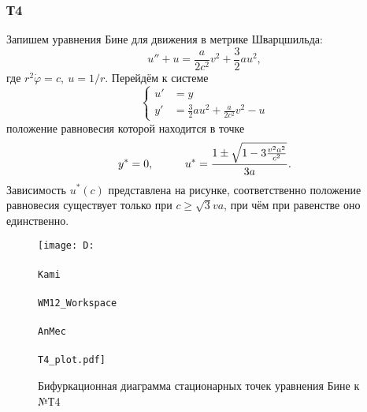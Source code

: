 \subsubsection*{Т4}

Запишем уравнения Бине для движения в метрике Шварцшильда:
\begin{equation*}
    u'' + u = \frac{a}{2c^2} v^2 + \frac{3}{2}a u^2,
\end{equation*}
где $r^2 \dot{\varphi} = c, \ u=1/r$. Перейдём к системе
\begin{equation*}
    \left\{\begin{aligned}
        u' &= y \\
        y' &= \frac{3}{2} a u^2 + \frac{a}{2c^2} v^2 - u
    \end{aligned}\right.
\end{equation*}
положение равновесия которой находится в точке
\begin{equation*}
    y^* = 0, \hspace{1 cm}
    u^* = 
    \frac{1\pm \sqrt{1-3 \frac{v^2 a^2}{c^2}}}{3a}.
\end{equation*}
Зависимость $u^*(c)$ представлена на рисунке, соответственно положение равновесия существует только при $c \geq \sqrt{3} v a$, при чём при равенстве оно единственно.
\begin{figure}[ht]
    \centering
    \texttt{[image: D:\\\\Kami\\\\WM12\_Workspace\\\\AnMec\\\\T4\_plot.pdf]}
    \caption{Бифуркационная диаграмма стационарных точек уравнения Бине к №Т4}
\end{figure}

